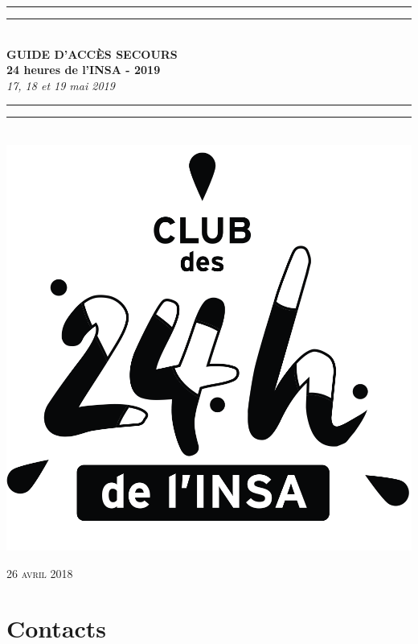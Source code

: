 \documentclass[hidelinks, paper=a4, fontsize=13pt]{report}
\begin{document}
\begin{center}
	\rule[0.5ex]{\linewidth}{2pt}\vspace*{-\baselineskip}\vspace*{3.2pt}
	\rule[0.5ex]{\linewidth}{1pt}\\[\baselineskip]
	\huge \textbf{GUIDE D'ACCÈS SECOURS\\24 heures de l'INSA - 2019} \\[4mm]
	{\Large \textit{17, 18 et 19 mai 2019}}\\
	\rule[0.5ex]{\linewidth}{1pt}\vspace*{-\baselineskip}\vspace{3.2pt}
	\rule[0.5ex]{\linewidth}{2pt}\\
	\vspace{30mm}
	\includegraphics[scale=2]{Annexes/Images_Acces/logo24h}\\
	
	\vspace{50mm}

\end{center}
	\begin{flushright}
		{\large\textsc{26 avril 2018}}
\end{flushright}

\chapter*{Contacts}
\end{document}
